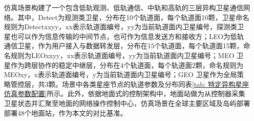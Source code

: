 \documentclass[print, master, vlined]{DissertUESTC}
\begin{document}
    仿真场景构建了一个包含低轨观测、低轨通信、中轨和高轨的三层异构卫星通信网络。其中，Detect为观测类卫星，分布在10个轨道面，每个轨道面10颗，卫星命名规则为Detectxxyy，xx表示轨道面编号，yy为当前轨道面内卫星编号，探测类卫星也可以作为信息传输的中间节点，也可作为信息发送方和接收方；LEO为低轨通信卫星，作为用户接入与数据转发层，分布在15个轨道面，每个轨道面15颗，命名规则为LEOxxyy，xx表示轨道面编号，yy为当前轨道面内卫星编号；MEO 卫星作为跨层协作的稳定中继层，分布在4个轨道面，每个轨道面2颗，命名规则为MEOxy，x表示轨道面编号，y为当前轨道面内卫星编号；GEO 卫星作为全局策略管控层，共3颗。场景中各类星座节点的轨道参数及分布同表\ref{tab: 特定异构星座仿真参数配置}所示。此外，依据地面式的控制架构中，地面站做为从控制器采集卫星状态并汇聚至地面的网络操作控制中心，仿真场景在全球主要区域及岛屿部署部署48个地面站，作为本文的对比基准。
    
        
\end{document}
